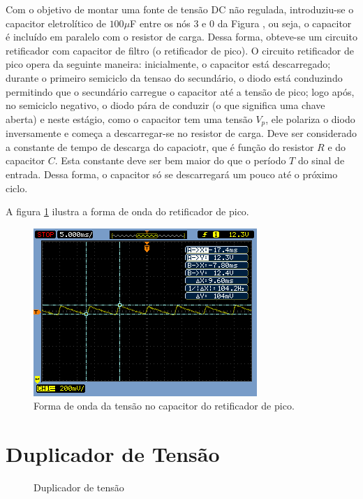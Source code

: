 \documentclass[a4paper]{article} %
\renewcommand{\thefigure}{\thesection.\arabic{figure}}
\begin{document}
    Com o objetivo de montar uma fonte de tensão DC não regulada, introduziu-se o capacitor eletrolítico de  $100\mu$F entre os nós 3 e 0 da Figura \label{fig:ret-circ2}, ou seja, o capacitor é incluído em paralelo com o resistor de carga. Dessa forma, obteve-se um circuito retificador com capacitor de filtro (o retificador de pico).
         O circuito retificador de pico opera da seguinte maneira: inicialmente, o capacitor está descarregado; durante o primeiro semiciclo da tensao do secundário, o diodo está conduzindo permitindo que o secundário carregue o capacitor até a tensão de pico; logo após, no semiciclo negativo, o diodo pára de conduzir (o que significa uma chave aberta) e neste estágio, como o capacitor tem uma tensão $V_p$, ele polariza o diodo inversamente e começa a descarregar-se no resistor de carga. Deve ser considerado a constante de tempo de descarga do capaciotr, que é função do resistor $R$ e do capacitor $C$. Esta constante deve ser bem maior do que o período $T$ do sinal de entrada. Dessa forma, o capacitor só se descarregará um pouco até o próximo ciclo.

A figura \ref{fig:cap-ret} ilustra a forma de onda do retificador de pico.

\begin{figure}[h!]
\begin{centering}
\includegraphics[scale=0.7]{Imagens/3.3.4capacitor_paralelo/3cap} \caption{Forma de onda da tensão no capacitor do retificador de pico. \label{fig:cap-ret}}
\par\end{centering}
\end{figure}

\newpage

\renewcommand{\thefigure}{\thesection.\arabic{figure}}

\section{Duplicador de Tensão}
 \setcounter{figure}{0}
\vspace{3mm}
\begin{figure}[h]
\centerline{}
\caption{Duplicador de tensão \label{tab:circ}}
\end{figure}
\end{document}
